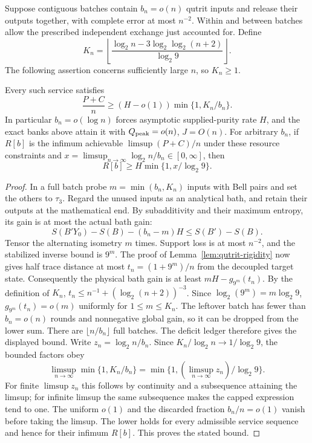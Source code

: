 Suppose contiguous batches contain $b_n=o(n)$ qutrit inputs and release
their outputs together, with complete error at most $n^{-2}$.
Within and between batches allow the prescribed independent exchange
just accounted for. Define
\[
 K_n=\left\lfloor\frac{\log_2n-3\log_2\log_2(n+2)}{\log_2 9}
       \right\rfloor.
\]
The following assertion concerns sufficiently large $n$, so $K_n\geq1$.
\begin{proposition}\label{prop:batch-purity-lower}
Every such service satisfies
\[
 \frac{P+C}{n}\geq (H-o(1))\min\{1,K_n/b_n\}.
\]
In particular $b_n=o(\log n)$ forces asymptotic supplied-purity
rate $H$, and the exact banks above attain it with $Q_{\rm peak}=o(n)$,
$J=O(n)$. For arbitrary $b_n$, if $R[b]$ is the infimum achievable
$\limsup(P+C)/n$ under these resource constraints and
$x=\limsup_{n\to\infty}\log_2n/b_n\in[0,\infty]$, then
\[
 R[b]\geq H\min\{1,x/\log_2 9\}.
\]
\end{proposition}
\begin{proof}
In a full batch probe $m=\min(b_n,K_n)$ inputs with Bell pairs and
set the others to $\tau_3$. Regard the unused inputs as an analytical
bath, and retain their outputs at the mathematical end. By subadditivity
and their maximum entropy, its gain is at most the actual bath gain:
\[
 S(B'Y_0)-S(B)-(b_n-m)H\leq S(B')-S(B).
\]
Tensor the alternating isometry $m$ times. Support loss is at most
$n^{-2}$, and the stabilized inverse bound is $9^m$. The proof of
Lemma~\ref{lem:qutrit-rigidity} now gives half trace distance at most
$t_n=(1+9^m)/n$ from the decoupled target state. Consequently the
physical bath gain is at least $mH-g_{9^m}(t_n)$.
By the definition of $K_n$,
$t_n\leq n^{-1}+(\log_2(n+2))^{-3}$.
Since $\log_2(9^m)=m\log_2 9$,
$g_{9^m}(t_n)=o(m)$ uniformly for $1\leq m\leq K_n$.
The leftover batch has fewer than $b_n=o(n)$ rounds and nonnegative
global gain, so it can be dropped from the lower sum.
There are $\lfloor n/b_n\rfloor$ full batches. The deficit ledger
therefore gives the displayed bound. Write $z_n=\log_2n/b_n$. Since
$K_n/\log_2n\to1/\log_2 9$, the bounded factors obey
\[
 \limsup_{n\to\infty}\min\{1,K_n/b_n\}
 =\min\{1,(\limsup_{n\to\infty}z_n)/\log_2 9\}.
\]
For finite $\limsup z_n$ this follows by continuity and a subsequence
attaining the limsup; for infinite limsup the same subsequence makes
the capped expression tend to one. The uniform $o(1)$ and the
discarded fraction $b_n/n=o(1)$ vanish before taking the limsup.
The lower holds for every admissible service sequence and hence for
their infimum $R[b]$. This proves the stated bound.
\end{proof}


